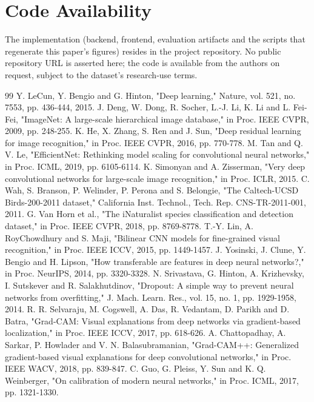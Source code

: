 \documentclass[conference]{IEEEtran}
\begin{document}
\section*{Code Availability}
The implementation (backend, frontend, evaluation artifacts and the scripts that regenerate this paper's figures) resides in the project repository. No public repository URL is asserted here; the code is available from the authors on request, subject to the dataset's research-use terms.
\begin{thebibliography}{99}
 Y. LeCun, Y. Bengio and G. Hinton, "Deep learning," Nature, vol. 521, no. 7553, pp. 436-444, 2015.
 J. Deng, W. Dong, R. Socher, L.-J. Li, K. Li and L. Fei-Fei, "ImageNet: A large-scale hierarchical image database," in Proc. IEEE CVPR, 2009, pp. 248-255.
 K. He, X. Zhang, S. Ren and J. Sun, "Deep residual learning for image recognition," in Proc. IEEE CVPR, 2016, pp. 770-778.
 M. Tan and Q. V. Le, "EfficientNet: Rethinking model scaling for convolutional neural networks," in Proc. ICML, 2019, pp. 6105-6114.
 K. Simonyan and A. Zisserman, "Very deep convolutional networks for large-scale image recognition," in Proc. ICLR, 2015.
 C. Wah, S. Branson, P. Welinder, P. Perona and S. Belongie, "The Caltech-UCSD Birds-200-2011 dataset," California Inst. Technol., Tech. Rep. CNS-TR-2011-001, 2011.
 G. Van Horn et al., "The iNaturalist species classification and detection dataset," in Proc. IEEE CVPR, 2018, pp. 8769-8778.
 T.-Y. Lin, A. RoyChowdhury and S. Maji, "Bilinear CNN models for fine-grained visual recognition," in Proc. IEEE ICCV, 2015, pp. 1449-1457.
 J. Yosinski, J. Clune, Y. Bengio and H. Lipson, "How transferable are features in deep neural networks?," in Proc. NeurIPS, 2014, pp. 3320-3328.
 N. Srivastava, G. Hinton, A. Krizhevsky, I. Sutskever and R. Salakhutdinov, "Dropout: A simple way to prevent neural networks from overfitting," J. Mach. Learn. Res., vol. 15, no. 1, pp. 1929-1958, 2014.
 R. R. Selvaraju, M. Cogswell, A. Das, R. Vedantam, D. Parikh and D. Batra, "Grad-CAM: Visual explanations from deep networks via gradient-based localization," in Proc. IEEE ICCV, 2017, pp. 618-626.
 A. Chattopadhay, A. Sarkar, P. Howlader and V. N. Balasubramanian, "Grad-CAM++: Generalized gradient-based visual explanations for deep convolutional networks," in Proc. IEEE WACV, 2018, pp. 839-847.
 C. Guo, G. Pleiss, Y. Sun and K. Q. Weinberger, "On calibration of modern neural networks," in Proc. ICML, 2017, pp. 1321-1330.

\end{thebibliography}
\end{document}

